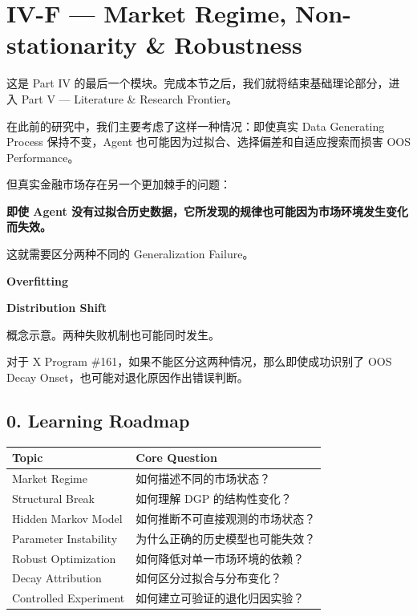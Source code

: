 \hypertarget{part-4-77-0001-iv-f-market-regime-non-stationarity-robustness}{%
\section{IV-F --- Market Regime, Non-stationarity \& Robustness}\label{part-4-77-0001-iv-f-market-regime-non-stationarity-robustness}}

这是 Part IV 的最后一个模块。完成本节之后，我们就将结束基础理论部分，进入 Part V --- Literature \& Research Frontier。

在此前的研究中，我们主要考虑了这样一种情况：即使真实 Data Generating Process 保持不变，Agent 也可能因为过拟合、选择偏差和自适应搜索而损害 OOS Performance。

但真实金融市场存在另一个更加棘手的问题：

\textbf{即使 Agent 没有过拟合历史数据，它所发现的规律也可能因为市场环境发生变化而失效。}

这就需要区分两种不同的 Generalization Failure。

\textbf{Overfitting}


\textbf{Distribution Shift}


概念示意。两种失败机制也可能同时发生。

对于 X Program \#161，如果不能区分这两种情况，那么即使成功识别了 OOS Decay Onset，也可能对退化原因作出错误判断。

\hypertarget{part-4-77-0001-learning-roadmap}{%
\subsection{0. Learning Roadmap}\label{part-4-77-0001-learning-roadmap}}

\begin{readertable}
\begin{longtable}[]{@{}
  >{\raggedright\arraybackslash}p{}
  >{\raggedright\arraybackslash}p{}@{}}
\toprule
Topic & Core Question \\
\midrule
\endhead
Market Regime & 如何描述不同的市场状态？ \\
Structural Break & 如何理解 DGP 的结构性变化？ \\
Hidden Markov Model & 如何推断不可直接观测的市场状态？ \\
Parameter Instability & 为什么正确的历史模型也可能失效？ \\
Robust Optimization & 如何降低对单一市场环境的依赖？ \\
Decay Attribution & 如何区分过拟合与分布变化？ \\
Controlled Experiment & 如何建立可验证的退化归因实验？ \\
\bottomrule
\end{longtable}
\end{readertable}

